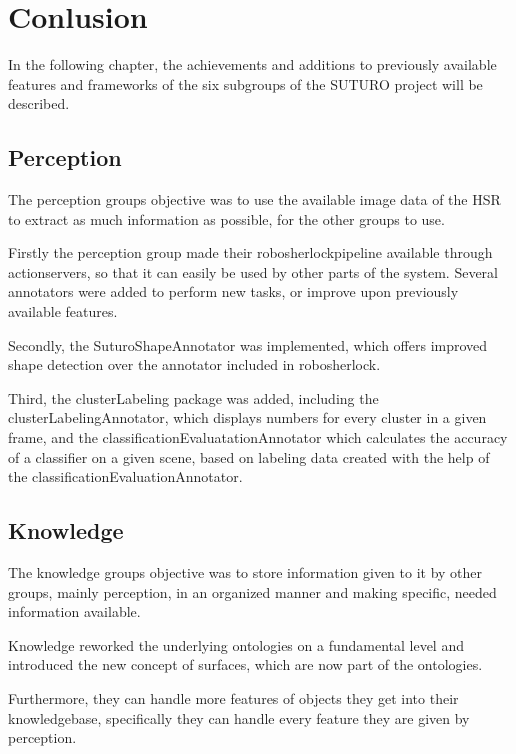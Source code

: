 \documentclass[main.tex]{subfiles}
\begin{document}
	\begingroup

	\renewcommand{\cleardoublepage}{}

	\renewcommand{\clearpage}{}

	\chapter{Conlusion}
		In the following chapter, the achievements and additions to previously available features and frameworks of the six subgroups of the SUTURO project will be described.
		
		\section{Perception}
		The perception groups objective was to use the available image data of the HSR to extract as much information as possible, for the other groups to use.
				
		Firstly the perception group made their robosherlockpipeline available through actionservers, so that it can easily be used by other parts of the system. Several annotators were added to perform new tasks, or improve upon previously available features. 
		
		Secondly, the SuturoShapeAnnotator was implemented, which offers improved shape detection over the annotator included in robosherlock. 
		
		Third, the clusterLabeling package was added, including the clusterLabelingAnnotator, which displays numbers for every cluster in a given frame, and the classificationEvaluatationAnnotator which calculates the accuracy of a classifier on a given scene, based on labeling data created with the help of the classificationEvaluationAnnotator. 
		
		
		\section{Knowledge}
		The knowledge groups objective was to store information given to it by other groups, mainly perception, in an organized manner and making specific, needed information available.
		
		Knowledge reworked the underlying ontologies on a fundamental level and introduced the new concept of surfaces, which are now part of the ontologies.
		
		Furthermore, they can handle more features of objects they get into their knowledgebase, specifically they can handle every feature they are given by perception.
		
\end{document}
